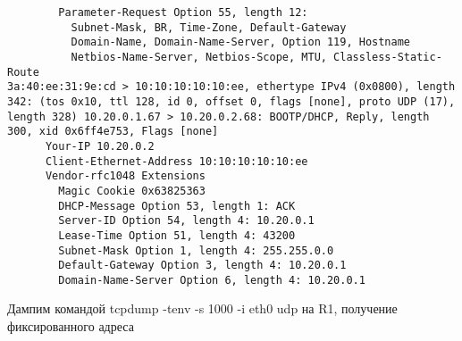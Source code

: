 \documentclass[a4paper,12pt]{article}
\begin{document}
\begin{Verbatim}
	    Parameter-Request Option 55, length 12: 
	      Subnet-Mask, BR, Time-Zone, Default-Gateway
	      Domain-Name, Domain-Name-Server, Option 119, Hostname
	      Netbios-Name-Server, Netbios-Scope, MTU, Classless-Static-Route
3a:40:ee:31:9e:cd > 10:10:10:10:10:ee, ethertype IPv4 (0x0800), length 342: (tos 0x10, ttl 128, id 0, offset 0, flags [none], proto UDP (17), length 328) 10.20.0.1.67 > 10.20.0.2.68: BOOTP/DHCP, Reply, length 300, xid 0x6ff4e753, Flags [none]
	  Your-IP 10.20.0.2
	  Client-Ethernet-Address 10:10:10:10:10:ee
	  Vendor-rfc1048 Extensions
	    Magic Cookie 0x63825363
	    DHCP-Message Option 53, length 1: ACK
	    Server-ID Option 54, length 4: 10.20.0.1
	    Lease-Time Option 51, length 4: 43200
	    Subnet-Mask Option 1, length 4: 255.255.0.0
	    Default-Gateway Option 3, length 4: 10.20.0.1
	    Domain-Name-Server Option 6, length 4: 10.20.0.1

\end{Verbatim}

Дампим командой tcpdump -tenv -s 1000 -i eth0 udp на R1, получение фиксированного адреса
\end{document}
